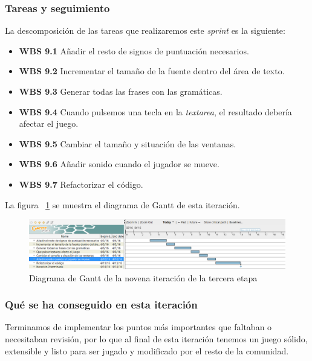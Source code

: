 \subsubsection{Tareas y seguimiento}

La descomposición de las tareas que realizaremos este \textit{sprint} es la siguiente:

\begin{itemize}
  \item \textbf{WBS 9.1} Añadir el resto de signos de puntuación necesarios.
  \item \textbf{WBS 9.2} Incrementar el tamaño de la fuente dentro del área de texto.
  \item \textbf{WBS 9.3} Generar todas las frases con las gramáticas.
  \item \textbf{WBS 9.4} Cuando pulsemos una tecla en la \textit{textarea}, el resultado debería afectar el juego.
  \item \textbf{WBS 9.5} Cambiar el tamaño y situación de las ventanas.
  \item \textbf{WBS 9.6} Añadir sonido cuando el jugador se mueve.
  \item \textbf{WBS 9.7} Refactorizar el código.
\end{itemize}

\noindent La figura ~\ref{fig:sec3it9} se muestra el diagrama de Gantt de esta iteración.

\begin{figure}
    \includegraphics[width=\textwidth,height=\textheight,keepaspectratio]{./img/sec3it9.png}
  \caption{Diagrama de Gantt de la novena iteración de la tercera etapa}
  \label{fig:sec3it9}
\end{figure}

\subsubsection{Qué se ha conseguido en esta iteración}

Terminamos de implementar los puntos más importantes que faltaban o necesitaban revisión, por lo que al final de esta iteración tenemos un juego sólido, extensible y listo para ser jugado y modificado por el resto de la comunidad.

